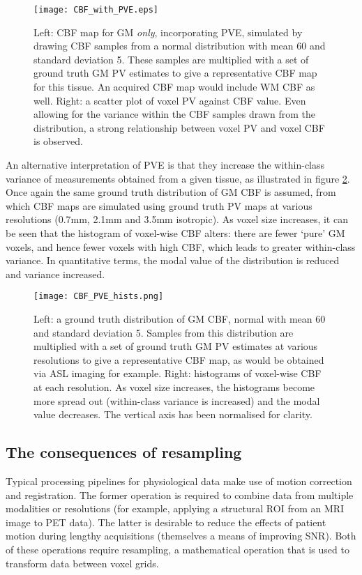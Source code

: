 \begin{figure}
\centering
\texttt{[image: CBF\_with\_PVE.eps]}
\caption{Left: CBF map for GM \textit{only}, incorporating PVE, simulated by drawing CBF samples from a normal distribution with mean 60 and standard deviation 5. These samples are multiplied with a set of ground truth GM PV estimates to give a representative CBF map for this tissue. An acquired CBF map would include WM CBF as well.  Right: a scatter plot of voxel PV against CBF value. Even allowing for the variance within the CBF samples drawn from the distribution, a strong relationship between voxel PV and voxel CBF is observed.}
\label{CBF_with_PVE_demo}
\end{figure}

An alternative interpretation of PVE is that they increase the within-class variance of measurements obtained from a given tissue, as illustrated in figure \ref{CBF_PVE_hist_simple}. Once again the same ground truth distribution of GM CBF is assumed, from which CBF maps are simulated using ground truth PV maps at various resolutions (0.7mm, 2.1mm and 3.5mm isotropic). As voxel size increases, it can be seen that the histogram of voxel-wise CBF alters: there are fewer `pure' GM voxels, and hence fewer voxels with high CBF, which leads to greater within-class variance. In quantitative terms, the modal value of the distribution is reduced and variance increased. 

\begin{figure}
\centering
\texttt{[image: CBF\_PVE\_hists.png]}
\caption{Left: a ground truth distribution of GM CBF, normal with mean 60 and standard deviation 5. Samples from this distribution are multiplied with a set of ground truth GM PV estimates at various resolutions to give a representative CBF map, as would be obtained via ASL imaging for example. Right: histograms of voxel-wise CBF at each resolution. As voxel size increases, the histograms become more spread out (within-class variance is increased) and the modal value decreases. The vertical axis has been normalised for clarity.}
\label{CBF_PVE_hist_simple}
\end{figure}

\subsection{The consequences of resampling}

Typical processing pipelines for physiological data make use of motion correction and registration. The former operation is required to combine data from multiple modalities or resolutions (for example, applying a structural ROI from an MRI image to PET data). The latter is desirable to reduce the effects of patient motion during lengthy acquisitions (themselves a means of improving SNR). Both of these operations require resampling, a mathematical operation that is used to transform data between voxel grids.  

